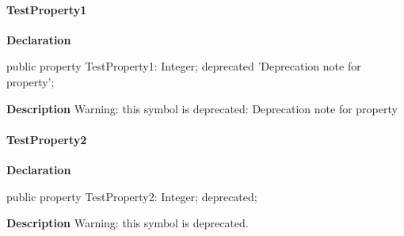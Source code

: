 \documentclass{report}
\begin{document}
\paragraph*{TestProperty1}\hspace*{\fill}

\begin{list}{}{
\setlength{\itemindent}{0cm}
\setlength{\listparindent}{0cm}
\setlength{\leftmargin}{\evensidemargin}
\addtolength{\leftmargin}{\tmplength}
\settowidth{\labelsep}{X}
\addtolength{\leftmargin}{\labelsep}
\setlength{\labelwidth}{\tmplength}
}
\begin{flushleft}
\item[\textbf{Declaration}\hfill]
\begin{ttfamily}
public property TestProperty1: Integer; deprecated 'Deprecation note for property';\end{ttfamily}


\end{flushleft}
\par
\item[\textbf{Description}]
Warning: this symbol is deprecated: Deprecation note for property

 

\end{list}
\paragraph*{TestProperty2}\hspace*{\fill}

\begin{list}{}{
\setlength{\itemindent}{0cm}
\setlength{\listparindent}{0cm}
\setlength{\leftmargin}{\evensidemargin}
\addtolength{\leftmargin}{\tmplength}
\settowidth{\labelsep}{X}
\addtolength{\leftmargin}{\labelsep}
\setlength{\labelwidth}{\tmplength}
}
\begin{flushleft}
\item[\textbf{Declaration}\hfill]
\begin{ttfamily}
public property TestProperty2: Integer; deprecated;\end{ttfamily}


\end{flushleft}
\par
\item[\textbf{Description}]
Warning: this symbol is deprecated.

 

\end{list}
\end{document}
